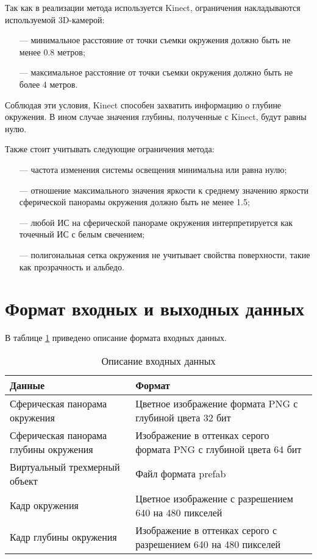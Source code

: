 Так как в реализации метода используется Kinect, ограничения накладываются используемой 3D-камерой:

\begin{itemize}
	\item[---] минимальное расстояние от точки съемки окружения должно быть не менее 0.8 метров;
	\item[---] максимальное расстояние от точки съемки окружения должно быть не более 4 метров.
\end{itemize}

Соблюдая эти условия, Kinect способен захватить информацию о глубине окружения. В ином случае значения глубины, полученные с Kinect, будут равны нулю.

Также стоит учитывать следующие ограничения метода:

\begin{itemize}
	\item[---] частота изменения системы освещения минимальна или равна нулю;
	\item[---] отношение максимального значения яркости к среднему значению яркости сферической панорамы окружения должно быть не менее 1.5;
	\item[---] любой ИС на сферической панораме окружения интерпретируется как точечный ИС с белым свечением;
	\item[---] полигональная сетка окружения не учитывает свойства поверхности, такие как прозрачность и альбедо.
\end{itemize}

\section{Формат входных и выходных данных}

В таблице \ref{FormatData} приведено описание формата входных данных.

\begin{table}[H]
	\caption{Описание входных данных}
	\label{FormatData}
	\begin{center}
		\begin{tabular}{| p{6 cm} | p{9 cm} |} 
			\hline
			Данные & Формат \\
			\hline
			Сферическая панорама окружения & Цветное изображение формата PNG с глубиной цвета 32 бит \\
			\hline
			Сферическая панорама глубины окружения & Изображение в оттенках серого формата PNG с глубиной цвета 64 бит \\
			\hline
			Виртуальный трехмерный объект & Файл формата prefab \\
			\hline
			Кадр окружения & Цветное изображение с разрешением 640 на 480 пикселей \\
			\hline
			Кадр глубины окружения & Изображение в оттенках серого с разрешением 640 на 480 пикселей \\
			\hline
		\end{tabular}
	\end{center}
\end{table}

